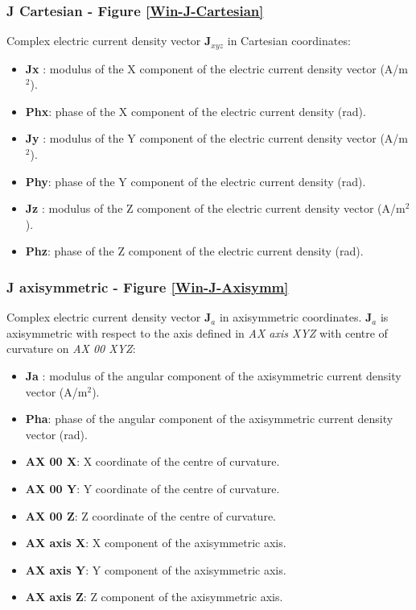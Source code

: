 \subsubsection{J Cartesian - Figure \ref{Win-J-Cartesian}}

Complex electric current density vector $\textbf{J}_{xyz}$ in Cartesian coordinates:
\begin{itemize}\itemsep0em 
	\item \textbf{Jx }: modulus of the X component of the electric current density vector (A/m$^{2}$).
	\item \textbf{Phx}: phase of the X component of the electric current density (rad).
	\\
	\item \textbf{Jy }: modulus of the Y component of the electric current density vector (A/m$^{2}$).
	\item \textbf{Phy}: phase of the Y component of the electric current density (rad).
	\\
	\item \textbf{Jz }: modulus of the Z component of the electric current density vector (A/m$^{2}$).
	\item \textbf{Phz}: phase of the Z component of the electric current density (rad).
\end{itemize}

\subsubsection{J axisymmetric - Figure \ref{Win-J-Axisymm}}

Complex electric current density vector $\textbf{J}_{a}$ in axisymmetric coordinates. $\textbf{J}_{a}$ is axisymmetric with respect to the axis defined in \emph{AX axis XYZ} with centre of curvature on \emph{AX 00 XYZ}:
\begin{itemize}\itemsep0em 
	\item \textbf{Ja }: modulus of the angular component of the axisymmetric current density vector (A/m$^{2}$). 
	\item \textbf{Pha}: phase of the angular component of the axisymmetric current density vector (rad).
	\\
	\item \textbf{AX 00 X}: X coordinate of the centre of curvature.
	\item \textbf{AX 00 Y}: Y coordinate of the centre of curvature.
	\item \textbf{AX 00 Z}: Z coordinate of the centre of curvature.
	\\
	\item \textbf{AX axis X}: X component of the axisymmetric axis.
	\item \textbf{AX axis Y}: Y component of the axisymmetric axis.
	\item \textbf{AX axis Z}: Z component of the axisymmetric axis.
\end{itemize}

